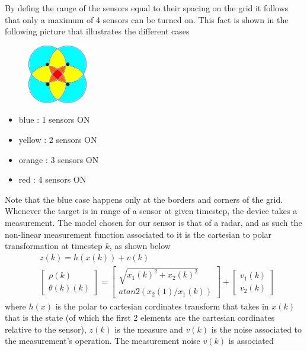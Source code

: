 \documentclass[twocolumn]{article}
\begin{document}
By defing the range of the sensors equal to their spacing on the grid it follows that only a maximum of 4 sensors can be turned on.
This fact is shown in the following picture that illustrates the different cases
\begin{figure}[h!]
    \centering
    \includegraphics[width=0.23\textwidth]{Immagini/4sensor.png}
    \caption{}
    \label{fig:number}
\end{figure}
\begin{itemize}
    \item blue : 1 sensors ON
    \item yellow : 2 sensors ON
    \item orange : 3 sensors ON
    \item red : 4 sensors ON
\end{itemize}
Note that the blue case happens only at the borders and corners of the grid.
\\
Whenever the target is in range of a sensor at given timestep, the device takes a measurement.
The model chosen for our sensor is that of a radar, and as such the non-linear measurement function
associated to it is the cartesian to polar transformation at timestep $k$, as shown below
\begin{align*}
     & z(k)=h(x(k))+v(k)          \\
     & \begin{bmatrix}
        \rho(k) \\ \theta (k)(k)
    \end{bmatrix}=
    \begin{bmatrix}
        \sqrt{x_{1}(k)^2+x_{2}(k)^2} \\ atan2(x_{2}(1)/x_{1}(k))
    \end{bmatrix} +
    \begin{bmatrix}
        v_{1}(k) \\v_{2}(k)
    \end{bmatrix}
\end{align*}
where $h(x)$ is the polar to cartesian cordinates transform that takes in $x(k)$ that is the state (of which the first 2 elements are the cartesian
cordinates relative to the sensor), $z(k)$ is the measure and $v(k)$ is the noise associated to the measurement's operation. The measurement noise $v(k)$ is associated
\end{document}
